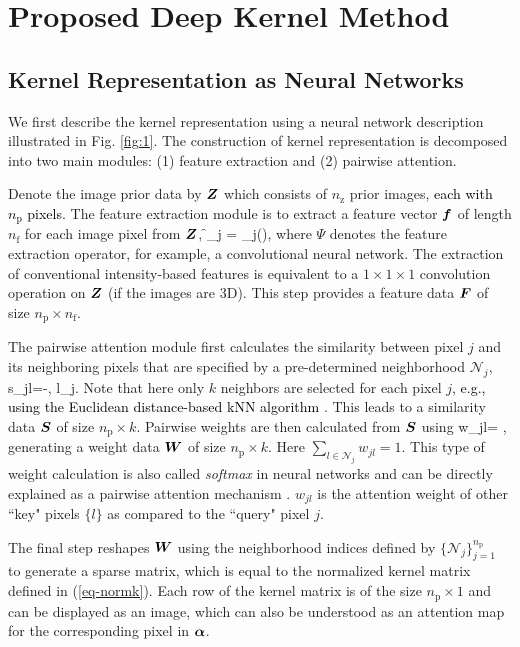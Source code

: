 \documentclass[]{IEEETran}
\newcommand{\np}{n_\mathrm{p}}
\newcommand{\nf}{n_\mathrm{f}}
\newcommand{\nz}{n_\mathrm{z}}
\newcommand{\txtb}[1]{\textcolor{black}{#1}}
\begin{document}
	
	
	\section{Proposed Deep Kernel Method}
	
	\subsection{Kernel Representation as Neural Networks}
	
	We first describe the kernel representation using a neural network description  illustrated in Fig. \ref{fig:1}. The construction of kernel representation is decomposed into two main modules: (1) feature extraction and (2) pairwise attention.
	
	Denote the image prior data by $\bm{Z}$ which consists of  $\nz$ prior images, \txtb{each with $\np$ pixels.} The feature extraction module is to extract a feature vector $\bm{f}$ of length $\nf$ for each image pixel from $\bm{Z}$,
	\beq
	\f_j = \Psi_j(),
	\eeq
	where $\Psi$ denotes the feature extraction operator, for example, a convolutional neural network. The extraction of conventional intensity-based features is equivalent to a $1\times 1\times 1$ convolution operation on $\bm{Z}$ (if the images are 3D). This step provides a feature data $\bm{F}$ of size $\np\times\nf$. 
	
	The pairwise attention module first calculates the similarity between pixel $j$ and its neighboring pixels that are specified by a pre-determined neighborhood $\mathcal{N}_j$, 
	\beq
	s_{jl}=-, l\in {}_j.
	\label{similarity}
	\eeq
	Note that here only  $k$ neighbors are selected for each pixel $j$, \txtb{e.g., using the Euclidean distance-based kNN algorithm \cite{Wang2015, Friedman1977}}. This leads to a similarity data $\bm{S}$ of size $\np\times k$. Pairwise weights are then calculated from $\bm{S}$ using 
	\beq
	w_{jl}= ,
	\label{softmax}
	\eeq 
	generating a weight data $\bm{W}$ of size $\np\times k$. Here $\sum_{l\in \mathcal{N}_j} w_{jl}=1$. This type of weight calculation is also called \textit{softmax} in neural networks and can be directly explained as a pairwise attention mechanism \cite{Vaswani2017, Wang2018}. $w_{jl}$ is the attention weight of other ``key" pixels $\{l\}$ as compared to the ``query" pixel $j$.
	
	The final step reshapes $\bm{W}$ using the neighborhood indices defined by $\{\mathcal{N}_j\}_{j=1}^{\np}$ to generate a sparse matrix, which is equal to the normalized kernel matrix defined in (\ref{eq-normk}). Each row of the kernel matrix is of the size $\np\times 1$ and can be displayed as an image, which can also be understood as an attention map for the corresponding pixel in $\bm{\alpha}$. 
	
\end{document}
